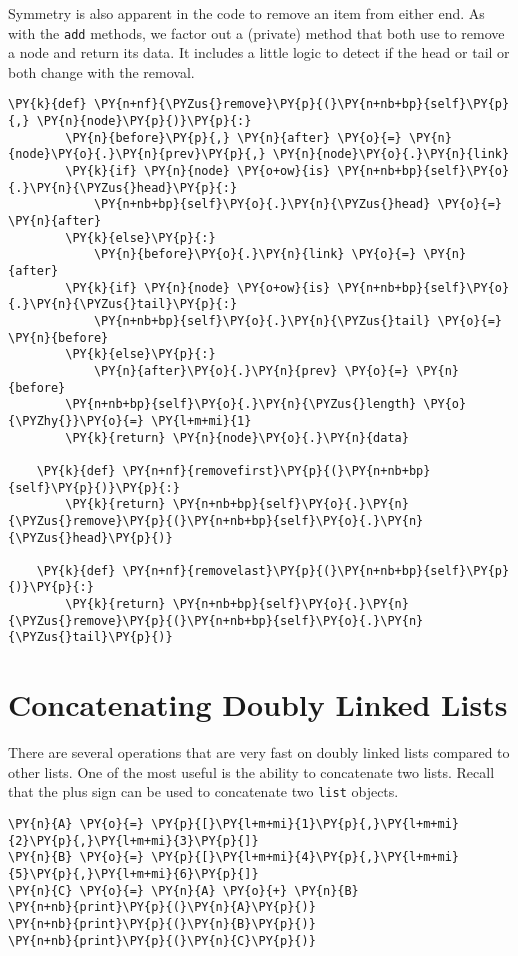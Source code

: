 Symmetry is also apparent in the code to remove an item from either end.
As with the \texttt{add} methods, we factor out a (private) method that both use to remove a node and return its data.
It includes a little logic to detect if the head or tail or both change with the removal.

\begin{Verbatim}[commandchars=\\\{\}]
    \PY{k}{def} \PY{n+nf}{\PYZus{}remove}\PY{p}{(}\PY{n+nb+bp}{self}\PY{p}{,} \PY{n}{node}\PY{p}{)}\PY{p}{:}
        \PY{n}{before}\PY{p}{,} \PY{n}{after} \PY{o}{=} \PY{n}{node}\PY{o}{.}\PY{n}{prev}\PY{p}{,} \PY{n}{node}\PY{o}{.}\PY{n}{link}
        \PY{k}{if} \PY{n}{node} \PY{o+ow}{is} \PY{n+nb+bp}{self}\PY{o}{.}\PY{n}{\PYZus{}head}\PY{p}{:}
            \PY{n+nb+bp}{self}\PY{o}{.}\PY{n}{\PYZus{}head} \PY{o}{=} \PY{n}{after}
        \PY{k}{else}\PY{p}{:}
            \PY{n}{before}\PY{o}{.}\PY{n}{link} \PY{o}{=} \PY{n}{after}
        \PY{k}{if} \PY{n}{node} \PY{o+ow}{is} \PY{n+nb+bp}{self}\PY{o}{.}\PY{n}{\PYZus{}tail}\PY{p}{:}
            \PY{n+nb+bp}{self}\PY{o}{.}\PY{n}{\PYZus{}tail} \PY{o}{=} \PY{n}{before}
        \PY{k}{else}\PY{p}{:}
            \PY{n}{after}\PY{o}{.}\PY{n}{prev} \PY{o}{=} \PY{n}{before}
        \PY{n+nb+bp}{self}\PY{o}{.}\PY{n}{\PYZus{}length} \PY{o}{\PYZhy{}}\PY{o}{=} \PY{l+m+mi}{1}
        \PY{k}{return} \PY{n}{node}\PY{o}{.}\PY{n}{data}

    \PY{k}{def} \PY{n+nf}{removefirst}\PY{p}{(}\PY{n+nb+bp}{self}\PY{p}{)}\PY{p}{:}
        \PY{k}{return} \PY{n+nb+bp}{self}\PY{o}{.}\PY{n}{\PYZus{}remove}\PY{p}{(}\PY{n+nb+bp}{self}\PY{o}{.}\PY{n}{\PYZus{}head}\PY{p}{)}

    \PY{k}{def} \PY{n+nf}{removelast}\PY{p}{(}\PY{n+nb+bp}{self}\PY{p}{)}\PY{p}{:}
        \PY{k}{return} \PY{n+nb+bp}{self}\PY{o}{.}\PY{n}{\PYZus{}remove}\PY{p}{(}\PY{n+nb+bp}{self}\PY{o}{.}\PY{n}{\PYZus{}tail}\PY{p}{)}
\end{Verbatim}


\section{Concatenating Doubly Linked Lists}


There are several operations that are very fast on doubly linked lists compared to other lists.
One of the most useful is the ability to concatenate two lists.
Recall that the plus sign can be used to concatenate two \texttt{list} objects.


\begin{Verbatim}[commandchars=\\\{\}]
\PY{n}{A} \PY{o}{=} \PY{p}{[}\PY{l+m+mi}{1}\PY{p}{,}\PY{l+m+mi}{2}\PY{p}{,}\PY{l+m+mi}{3}\PY{p}{]}
\PY{n}{B} \PY{o}{=} \PY{p}{[}\PY{l+m+mi}{4}\PY{p}{,}\PY{l+m+mi}{5}\PY{p}{,}\PY{l+m+mi}{6}\PY{p}{]}
\PY{n}{C} \PY{o}{=} \PY{n}{A} \PY{o}{+} \PY{n}{B}
\PY{n+nb}{print}\PY{p}{(}\PY{n}{A}\PY{p}{)}
\PY{n+nb}{print}\PY{p}{(}\PY{n}{B}\PY{p}{)}
\PY{n+nb}{print}\PY{p}{(}\PY{n}{C}\PY{p}{)}
\end{Verbatim}

